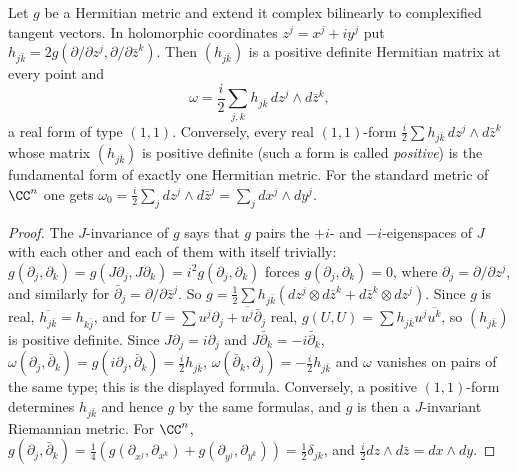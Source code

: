 \begin{proposition}\label{kahler:proposition-fundamental-form-coordinates}
Let $g$ be a Hermitian metric and extend it complex bilinearly to complexified tangent vectors. In holomorphic coordinates
$z^j = x^j + iy^j$ put $h_{j\bar k} = 2g(\partial/\partial z^j, \partial/\partial\bar z^k)$. Then $(h_{j\bar k})$ is a positive definite
Hermitian matrix at every point and
\[
\omega = \frac{i}{2}\sum_{j,k}h_{j\bar k}\,dz^j \wedge d\bar z^k,
\]
a real form of type $(1,1)$. Conversely, every real $(1,1)$-form $\frac{i}{2}\sum h_{j\bar k}\,dz^j \wedge d\bar z^k$ whose matrix
$(h_{j\bar k})$ is positive definite (such a form is called \emph{positive}) is the fundamental form of exactly one Hermitian metric. For the
standard metric of $\CC^n$ one gets $\omega_0 = \frac{i}{2}\sum_jdz^j \wedge d\bar z^j = \sum_jdx^j \wedge dy^j$.
\end{proposition}

\begin{proof}
The $J$-invariance of $g$ says that $g$ pairs the $+i$- and $-i$-eigenspaces of $J$ with each other and each of them with itself
trivially: $g(\partial_j, \partial_k) = g(J\partial_j, J\partial_k) = i^2g(\partial_j, \partial_k)$ forces $g(\partial_j, \partial_k) = 0$,
where $\partial_j = \partial/\partial z^j$, and similarly for $\bar\partial_j = \partial/\partial\bar z^j$. So
$g = \frac12\sum h_{j\bar k}(dz^j \otimes d\bar z^k + d\bar z^k \otimes dz^j)$. Since $g$ is real, $\overline{h_{j\bar k}} = h_{k\bar j}$,
and for $U = \sum u^j\partial_j + \overline{u^j}\bar\partial_j$ real, $g(U, U) = \sum h_{j\bar k}u^j\overline{u^k}$, so $(h_{j\bar k})$ is
positive definite. Since $J\partial_j = i\partial_j$ and $J\bar\partial_k = -i\bar\partial_k$,
$\omega(\partial_j, \bar\partial_k) = g(i\partial_j, \bar\partial_k) = \frac{i}{2}h_{j\bar k}$,
$\omega(\bar\partial_k, \partial_j) = -\frac{i}{2}h_{j\bar k}$ and $\omega$ vanishes on pairs of the same type; this is the displayed
formula. Conversely, a positive $(1,1)$-form determines $h_{j\bar k}$ and hence $g$ by the same formulas, and $g$ is then a $J$-invariant
Riemannian metric. For $\CC^n$, $g(\partial_j, \bar\partial_k) = \frac14(g(\partial_{x^j}, \partial_{x^k}) + g(\partial_{y^j}, \partial_{y^k})) = \frac12\delta_{jk}$, and
$\frac{i}{2}dz \wedge d\bar z = dx \wedge dy$.
\end{proof}

